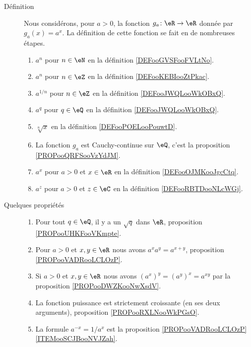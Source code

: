 \begin{description}
    \item[Définition] 
        Nous considérons, pour \( a>0\), la fonction \( g_a\colon \eR\to \eR\) donnée par \( g_a(x)=a^x\). La définition de cette fonction se fait en de nombreuses étapes.
\begin{enumerate}
    \item
        \( a^n\) pour \( n\in \eN\) en la définition \ref{DEFooGVSFooFVLtNo}.
    \item 
        \( a^n\) pour \( n\in \eZ\) en la définition \ref{DEFooKEBIooZtPkac}.
    \item
        \( a^{1/n}\) pour \( n\in \eZ\) en la définition \ref{DEFooJWQLooWkOBxQ}.
    \item
        \( a^q\) pour \( q\in \eQ\) en la définition \ref{DEFooJWQLooWkOBxQ}.
    \item
        \( \sqrt[n]{ x }\) en la définition \ref{DEFooPOELooPouwtD}.
    \item
        La fonction \( g_a\) est Cauchy-continue sur \( \eQ\), c'est la proposition \ref{PROPooQRFSooVzYdJM}.
    \item
        \( a^x\) pour \( a>0\) et \( x\in \eR\) en la définition \ref{DEFooOJMKooJgcCtq}.
    \item
        \( a^z\) pour \( a>0\) et \( z\in \eC\) en la définition \ref{DEFooRBTDooNLcWGj}.
\end{enumerate}

\item[Quelques propriétés]
\begin{enumerate}
    \item
        Pour tout \( q\in \eQ\), il y a un \( \sqrt{ q }\) dans \( \eR\), proposition \ref{PROPooUHKFooVKmpte}.
    \item
        Pour \( a>0\) et \( x,y\in \eR\) nous avons $a^xa^y=a^{x+y}$, proposition \ref{PROPooVADRooLCLOzP}.
    \item
        Si \( a>0\) et \( x,y\in \eR\) nous avons \( (a^x)^y=(a^y)^x=a^{xy}\) par la proposition \ref{PROPooDWZKooNwXsdV}.
    \item
        La fonction puissance est strictement croissante (en ses deux arguments), proposition \ref{PROPooRXLNooWkPGsO}.
    \item
        La formule \( a^{-x}=1/a^x\) est la proposition \ref{PROPooVADRooLCLOzP}\ref{ITEMooSCJBooNVJZah}.
\end{enumerate}


\end{description}
